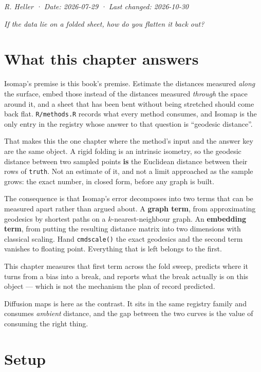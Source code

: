 \documentclass[
  british,
  a4paper,
]{book}
\begin{document}
\emph{R. Heller · Date: 2026-07-29 · Last changed: 2026-10-30}

\emph{If the data lie on a folded sheet, how do you flatten it back out?}

\section{What this chapter answers}\label{geo-question}

Isomap's premise is this book's premise. Estimate the distances measured \emph{along}
the surface, embed those instead of the distances measured \emph{through} the space
around it, and a sheet that has been bent without being stretched should come
back flat. \texttt{R/methods.R} records what every method consumes, and Isomap is the
only entry in the registry whose answer to that question is ``geodesic distance''.

That makes this the one chapter where the method's input and the answer key are
the same object. A rigid folding is an intrinsic isometry, so the geodesic
distance between two sampled points \textbf{is} the Euclidean distance between their
rows of \texttt{truth}. Not an estimate of it, and not a limit approached as the sample
grows: the exact number, in closed form, before any graph is built.

The consequence is that Isomap's error decomposes into two terms that can be
measured apart rather than argued about. A \textbf{graph term}, from approximating
geodesics by shortest paths on a \(k\)-nearest-neighbour graph. An \textbf{embedding
term}, from putting the resulting distance matrix into two dimensions with
classical scaling. Hand \texttt{cmdscale()} the exact geodesics and the second term
vanishes to floating point. Everything that is left belongs to the first.

This chapter measures that first term across the fold sweep, predicts where it
turns from a bias into a break, and reports what the break actually is on this
object --- which is not the mechanism the plan of record predicted.

Diffusion maps is here as the contrast. It sits in the same registry family and
consumes \emph{ambient} distance, and the gap between the two curves is the value of
consuming the right thing.

\section{Setup}\label{geo-setup}
\end{document}
